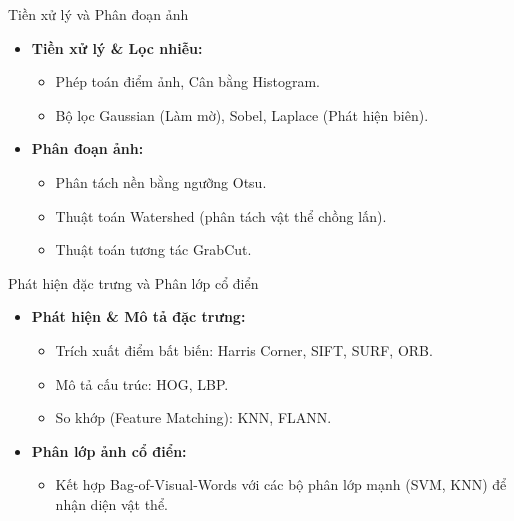 \documentclass[aspectratio=169]{beamer}
\begin{document}
\begin{frame}{Tiền xử lý và Phân đoạn ảnh}
    \begin{itemize}
        \item \textbf{Tiền xử lý \& Lọc nhiễu:}
        \begin{itemize}
            \item Phép toán điểm ảnh, Cân bằng Histogram.
            \item Bộ lọc Gaussian (Làm mờ), Sobel, Laplace (Phát hiện biên).
        \end{itemize}
        \item \textbf{Phân đoạn ảnh:}
        \begin{itemize}
            \item Phân tách nền bằng ngưỡng Otsu.
            \item Thuật toán Watershed (phân tách vật thể chồng lấn).
            \item Thuật toán tương tác GrabCut.
        \end{itemize}
    \end{itemize}
\end{frame}

\begin{frame}{Phát hiện đặc trưng và Phân lớp cổ điển}
    \begin{itemize}
        \item \textbf{Phát hiện \& Mô tả đặc trưng:}
        \begin{itemize}
            \item Trích xuất điểm bất biến: Harris Corner, SIFT, SURF, ORB.
            \item Mô tả cấu trúc: HOG, LBP.
            \item So khớp (Feature Matching): KNN, FLANN.
        \end{itemize}
        \item \textbf{Phân lớp ảnh cổ điển:}
        \begin{itemize}
            \item Kết hợp Bag-of-Visual-Words với các bộ phân lớp mạnh (SVM, KNN) để nhận diện vật thể.
        \end{itemize}
    \end{itemize}
\end{frame}
\end{document}
